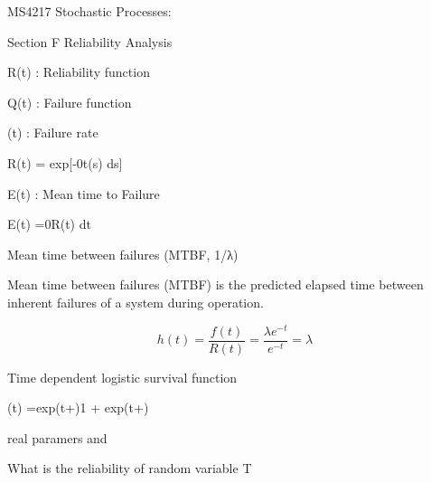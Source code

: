 
MS4217 Stochastic Processes:
 
Section F Reliability Analysis
 
  
R(t) : Reliability function
  
Q(t) : Failure function
 
\lambda(t) : Failure rate
 
 
    R(t) = exp[-0t(s) ds]
     
 
E(t) : Mean time to Failure
 
E(t) =0R(t) dt
 
Mean time between failures (MTBF, 1/λ)
 
Mean time between failures (MTBF) is the predicted elapsed time between inherent failures of a system during operation.
 
 
\[h(t) = \frac{f(t)}{R(t)} = \frac{\lambda e^{-t}}{e^{-t}}= \lambda\]
 
Time dependent logistic survival function
 
    (t) =exp(t+)1 + exp(t+)
 
real paramers  and 
 
What is the reliability of random variable T


